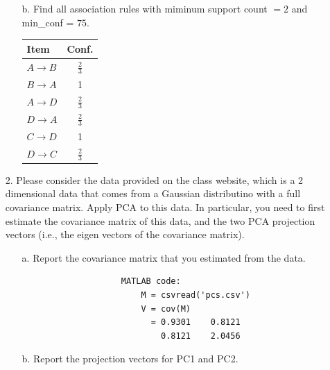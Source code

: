 \documentclass[12pt,letterpaper]{article}
\begin{document}
\begin{enumerate}
\begin{enumerate}
		\item[b.] Find all association rules with miminum support count $= 2$ and min\_conf = $75$.  \\
		\begin{tabular}{| l | c |}   
		\hline
		Item & Conf. \\ \hline
		\cellcolor{red}$A \rightarrow B$ & $\frac{2}{3}$  \\ \hline
		\cellcolor{green}$B \rightarrow A$ & 1  \\ \hline
		\cellcolor{red}$A \rightarrow D$ & $\frac{2}{3}$ \\ \hline
		\cellcolor{red}$D \rightarrow A$ & $\frac{2}{3}$ \\ \hline 
		\cellcolor{green}$C \rightarrow D$ & 1 \\ \hline 
		\cellcolor{red}$D \rightarrow C$ & $\frac{2}{3}$ \\ \hline 
		\end{tabular} 	
				
	\end{enumerate} 
	\item[2.] Please consider the data provided on the class website, which is a 2 dimensional data that comes from a Gaussian distributino with a full covariance matrix. Apply PCA to this data. In particular, you need to first estimate the covariance matrix of this data, and the two PCA projection vectors (i.e., the eigen vectors of the covariance matrix). \\
	\begin{enumerate} 
		\item[a.] Report the covariance matrix that you estimated from the data. \\
				\begin{verbatim} 
					MATLAB code:
						M = csvread('pcs.csv')
						V = cov(M)
						  = 0.9301    0.8121
							0.8121    2.0456
				\end{verbatim} 
		\item[b.] Report the projection vectors for PC1 and PC2. \\
				\begin{verbatim} 	


\end{verbatim}
\end{enumerate}
\end{enumerate}
\end{document}
